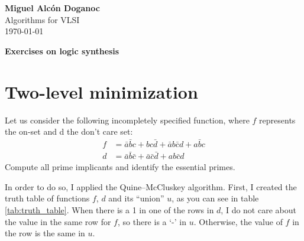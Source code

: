 \documentclass[a4paper, 10pt]{article}
\begin{document}
\noindent
\begin{flushright}
    \large\textbf{Miguel Alcón Doganoc} \\
    Algorithms for VLSI \\
    \today
\end{flushright}

\noindent
{\huge{\textbf{Exercises on logic synthesis}}}

\section{Two-level minimization}
{\color{statement} 
Let us consider the following incompletely specified function, where $f$ represents the on-set and d the don’t care set:
\begin{align*}
    f &= \bar{a}\bar{b}c + bc\bar{d} + \bar{a}b\bar{c}d + a\bar{b}c \\
    d &= \bar{a}\bar{b}\bar{c} + \bar{a}\bar{c}\bar{d} + ab\bar{c}d 
\end{align*}
Compute all prime implicants and identify the essential primes.}

In order to do so, I applied the Quine–McCluskey algorithm. First, I created the truth table of functions $f$, $d$ and its ``union'' $u$, as you can see in table \ref{tab:truth_table}. When there is a 1 in one of the rows in $d$, I do not care about the value in the same row for $f$, so there is a `-' in $u$. Otherwise, the value of $f$ in the row is the same in $u$.
\end{document}
